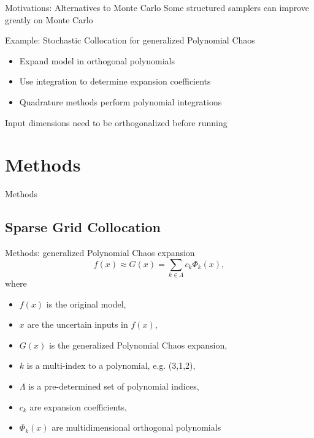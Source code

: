 \documentclass[t,9pt,svgnames]{beamer}
\begin{document}
\begin{frame}{Motivations: Alternatives to Monte Carlo}
  Some structured samplers can improve greatly on Monte Carlo

  Example: Stochastic Collocation for generalized Polynomial Chaos
  \begin{itemize}
    \item Expand model in orthogonal polynomials
    \item Use integration to determine expansion coefficients
    \item Quadrature methods perform polynomial integrations
  \end{itemize}
  Input dimensions need to be orthogonalized before running
\end{frame}
%
%
\section{Methods}
\begin{frame}{Methods}
\end{frame}

\subsection{Sparse Grid Collocation}
\begin{frame}{Methods: generalized Polynomial Chaos expansion}
  \begin{equation}
    f(x) \approx G(x) = \sum_{k\in\Lambda} c_k \Phi_k(x), 
  \end{equation}
  where
  \begin{itemize}
    \item $f(x)$ is the original model,
    \item $x$ are the uncertain inputs in $f(x)$,
    \item $G(x)$ is the generalized Polynomial Chaos expansion,
    \item $k$ is a multi-index to a polynomial, e.g. (3,1,2),
    \item $\Lambda$ is a pre-determined set of polynomial indices,
    \item $c_k$ are expansion coefficients,
    \item $\Phi_k(x)$ are multidimensional orthogonal polynomials
  \end{itemize}
\end{frame}
\end{document}
